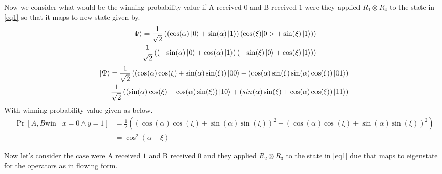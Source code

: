 Now we consider what would be the winning probability value if A received $0$ and B received $1$ were they applied $R_1\otimes R_4$ to the state in \ref{eq1} so that it maps  to new state given by.
\begin{equation*}
\begin{aligned}
\ket{\Psi} = \frac{1}{\sqrt{2}}\left( \left(\cos(\alpha)\ket{0}+\sin(\alpha)\ket{1} \right) \left(\cos(\xi)|0>+\sin(\xi)\ket{1} \right) \right)  \\  
+\frac{1}{\sqrt{2}} \left( \left(-\sin(\alpha)\ket{0}+\cos(\alpha)\ket{1} \right) \left(-\sin(\xi)\ket{0}+\cos(\xi)\ket{1} \right) \right)
\end{aligned}
\end{equation*}
\begin{equation*}
\begin{aligned}
\ket{\Psi }= \frac{1}{\sqrt{2}}\left(\left(\cos(\alpha) \cos(\xi)+\sin(\alpha) \sin(\xi)\right)\ket{00}+\left( \cos(\alpha)  \sin(\xi)\sin(\alpha)  \cos(\xi)\right)\ket{01}\right)\\
+\frac{1}{\sqrt{2}}\left( \left( \sin(\alpha)  \cos(\xi)-\cos(\alpha) \sin(\xi)\right)\ket{10}+\left(sin(\alpha)  \sin(\xi)+\cos(\alpha)  \cos(\xi)\right)\ket{11}\right)
\end{aligned}
\end{equation*}
With winning probability value given as below.
\begin{align} 
\Pr[A,B \text{win}  \mid  x=0 \wedge y=1]&=\frac{1}{2}\left(\left(\cos(\alpha)  \cos(\xi)+\sin(\alpha)\sin(\xi)\right)^2  +\left(\cos(\alpha)  \cos(\xi)+\sin(\alpha)\sin(\xi)\right)^2  \right)\nonumber\\ 
&=\cos^2(\alpha-\xi)\label{eq3}
\end{align}

Now let's consider  the case were  A received $1$ and B received $0$  and they applied $R_2\otimes R_3$ to the state in \ref{eq1}  due that maps to eigenstate for the operators as in flowing form.

